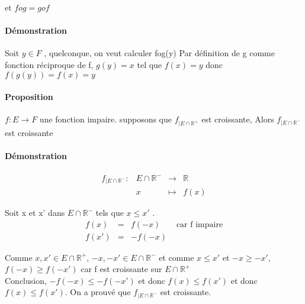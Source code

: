 et $fog = gof$

\paragraph{Démonstration} 
Soit $y \in F$ , quelconque, on veut calculer fog(y)
Par définition de g comme fonction réciproque de f, $g(y) = x$ tel que $f(x) = y$ donc $f(g(y)) = f(x) = y$

\paragraph{Proposition} $f:E\rightarrow F$ une fonction impaire. supposons que $f_{| E \cap \mathbb{R}^+}$ est croissante, Alors $f_{|E \cap \mathbb{R}^-}$ est croissante

\paragraph{Démonstration} 
\[\begin{array}{rccl}
	f_{|E\cap \mathbb{R}^-} : & E\cap \mathbb{R}^- &\rightarrow &\mathbb{R}\\
												 & x & \mapsto & f(x)
\end{array}\]

Soit x et x' dans $E \cap \mathbb{R}^-$ tels que $x \leq x'$ . 
\[\begin{array}{rccl}
	f(x) & = & f(-x) & \text{ car f impaire} \\
	f(x') & = & -f(-x)
\end{array}\]

Comme $x, x' \in E \cap \mathbb{R}^+$, $-x, -x' \in E \cap \mathbb{R}^-$ et comme $x \leq x'$ et $-x \geq -x'$, $f(-x) \geq f(-x')$ car f est croissante sur $E\cap \mathbb{R}^+$ ~\\
Conclusion, $-f(-x) \leq -f(-x')$ et donc $f(x) \leq f(x')$ et donc $f(x) \leq f(x')$. On a prouvé que $f_{|E \cap \mathbb{R}^-}$ est croissante.
